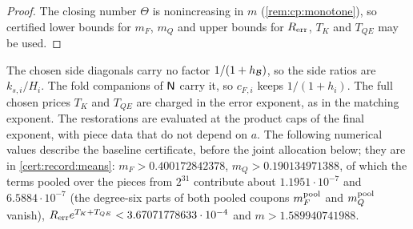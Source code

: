 \begin{proof}
The closing number $\Theta$ is nonincreasing in $m$ (\cref{rem:cp:monotone}), so
certified lower bounds for $m_F$, $m_Q$ and upper bounds for $R_{\rm err}$, $T_K$ and
$T_{QE}$ may be used.
\end{proof}

The chosen side diagonals carry no factor $1/(1+h_\mathcal B)$, so the side ratios
are $k_{s,i}/H_i$. The fold companions of $\mathsf N$ carry it, so $c_{F,i}$ keeps
$1/(1+h_i)$. The full chosen prices $T_K$ and $T_{QE}$ are charged in the error
exponent, as in the matching exponent. The restorations are
evaluated at the product caps of the final exponent, with piece
data that do not depend on $a$. The following numerical values describe
the baseline certificate, before the joint allocation below; they are in
\cref{cert:record:means}:
$m_F>0.400172842378$, $m_Q>0.190134971388$, of which the terms
pooled over the pieces from $2^{31}$ contribute
about $1.1951\cdot10^{-7}$ and $6.5884\cdot10^{-7}$ (the degree-six parts of both pooled coupons $m^{\rm pool}_F$ and $m^{\rm pool}_Q$ vanish),
$R_{\rm err}e^{T_K+T_{QE}}<3.67071778633\cdot10^{-4}$ and $m>1.589940741988$.



